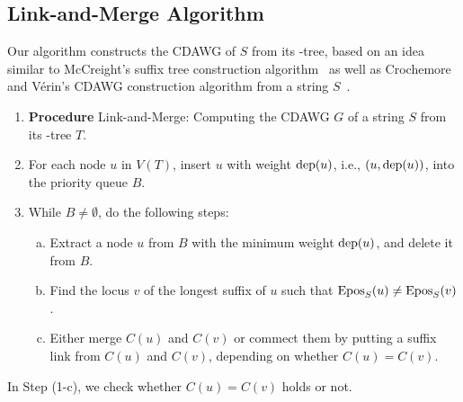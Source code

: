 \newpage
\subsection{Link-and-Merge Algorithm}
\label{sec:algo:link:merge}

Our algorithm constructs the CDAWG of $S$ from its \LPTrm-tree, based on an idea similar to McCreight's suffix tree construction algorithm~\cite{mccreight1976space} as well as Crochemore and V\'erin's CDAWG construction algorithm from a string $S$~\cite{crochemore:verin1997direct}.

\begin{definition}\label{lem:maxrep:algo:highlevel}
\begin{enumerate}[(1)]
\item[] \hspace{-.75\leftmargini}\textbf{Procedure} Link-and-Merge: Computing the CDAWG $G$ of a string $S$ from its \LPTrm-tree $T$.
\item For each node $u$ in $V(T)$, insert $u$ with weight $\mathrm{dep}(u)$, i.e., $(u, \mathrm{dep}(u))$, into the priority queue $B$.
\item While $B \not= \emptyset$, do the following steps: 
\begin{enumerate}[(a)]
\item Extract a node $u$ from $B$ with the minimum weight $\mathrm{dep}(u)$, and delete it from $B$. 
\item Find the locus $v$ of the longest suffix  of $u$ such that $\mathrm{Epos}_{S}(u) \not= \mathrm{Epos}_{S}(v)$.
\item Either merge $C(u)$ and $C(v)$ or commect them by putting a suffix link from  $C(u)$ and $C(v)$, depending on whether $C(u) = C(v)$. 
\end{enumerate}
\end{enumerate}
\end{definition}

In Step (1-c), we check whether $C(u) = C(v)$ holds or not. 



